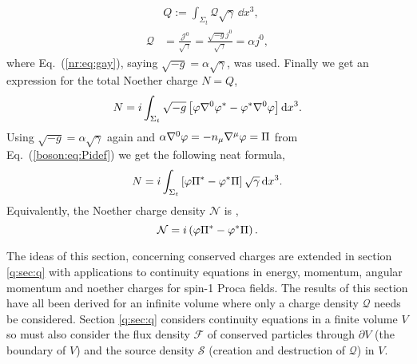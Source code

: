 \begin{align} 
&Q := \int_{\Sigma_t} \mathcal{Q}\sqrt{\gamma} \,\dd x^3 ,\\
\mathcal{Q}&= \frac{\mathcal{J}^0}{\sqrt{\gamma}} = \frac{\sqrt{-g}j^0}{\sqrt{\gamma}} = \alpha j^0,
\end{align}
where Eq.~(\ref{nr:eq:gay}), saying $\sqrt{-g}=\alpha\sqrt{\gamma}$, was used.
Finally we get an expression for the total Noether charge $N=Q$,
\begin{equation}
N =i \int_{\Sigma_t} \sqrt{-g}\left[ \varphi \nabla^0 \varphi^* - \varphi^*\nabla^0 \varphi\right] \dd x^3.
\end{equation}
Using $\sqrt{-g} = \alpha \sqrt{\gamma}$ again and $\alpha \nabla^0 \varphi = -n_\mu \nabla^\mu \varphi = \Pi$ from Eq.~(\ref{boson:eq:Pidef}) we get the following neat formula,
\begin{equation} 
N = i\int_{\Sigma_t}\left[ \varphi \Pi^*-\varphi^*\Pi\right] \sqrt{\gamma}\,\dd x^3.
\end{equation}
Equivalently, the Noether charge density $\mathcal{N}$ is ,
\begin{equation} 
\mathcal{N} = i\left( \varphi \Pi^*-\varphi^*\Pi\right) .
\end{equation}

The ideas of this section, concerning conserved charges are extended in section \ref{q:sec:q} with applications to continuity equations in energy, momentum, angular momentum and noether charges for spin-1 Proca fields. The results of this section have all been derived for an infinite volume where only a charge density $\mathcal{Q}$ needs be considered. Section \ref{q:sec:q} considers continuity equations in a finite volume $V$ so must also consider the flux density $\mathcal{F}$ of conserved particles through $\partial V$ (the boundary of $V$) and the source density $\mathcal{S}$ (creation and destruction of $\mathcal{Q}$) in $V$. 

